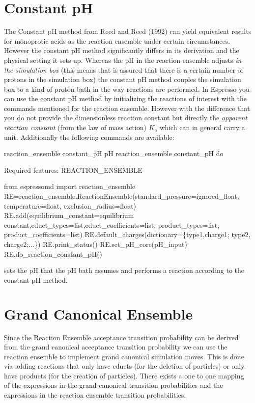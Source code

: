 \section{Constant pH}
The Constant pH method from Reed and Reed (1992) can yield equivalent results for monoprotic acids as the reaction ensemble under certain circumstances\cite{landsgesell2016b}. However the constant pH method significantly differs in its derivation and the physical setting it sets up. Whereas the pH in the reaction ensemble adjusts \textit{in the simulation box} (this means that is assured that there is a certain number of protons in the simulation box) the constant pH method couples the simulation box to a kind of proton bath in the way reactions are performed. In Espresso you can use the constant pH method by initializing the reactions of interest with the commands mentioned for the reaction ensemble. However with the difference that you do not provide the dimensionless reaction constant but directly the \textit{apparent reaction constant} (from the law of mass action) $K_a$ which can in general carry a unit. Additionally the following commands are available:
\begin{essyntax}
	 reaction_ensemble constant_pH pH 
	 reaction_ensemble constant_pH do
	
	Required features: REACTION_ENSEMBLE
\end{essyntax}

  \begin{pysyntax}
  	from espressomd import reaction_ensemble
  	RE=reaction_ensemble.ReactionEnsemble(standard_pressure=ignored_float, temperature=float, exclusion_radius=float)
  	RE.add(equilibrium_constant=equilibrium constant,educt_types=list,educt_coefficients=list, product_types=list, product_coefficients=list)
  	RE.default_charges(dictionary=\{type1,charge1; type2, charge2;...\})
	RE.print_status()
	RE.set_pH_core(pH_input)
	RE.do_reaction_constant_pH() 
	\begin{features}
	\end{features}
\end{pysyntax}


 sets the pH that the pH bath assumes and  performs a reaction according to the constant pH method.


\section{Grand Canonical Ensemble}
Since the Reaction Ensemble acceptance transition probability can be derived from the grand canonical acceptance transition probability we can use the reaction ensemble to implement grand canonical simulation moves. This is done via adding reactions that only have educts (for the deletion of particles) or only have products (for the creation of particles). There exists a one to one mapping of the expressions in the grand canonical transition probabilities and the expressions in the reaction ensemble transition probabilities.
